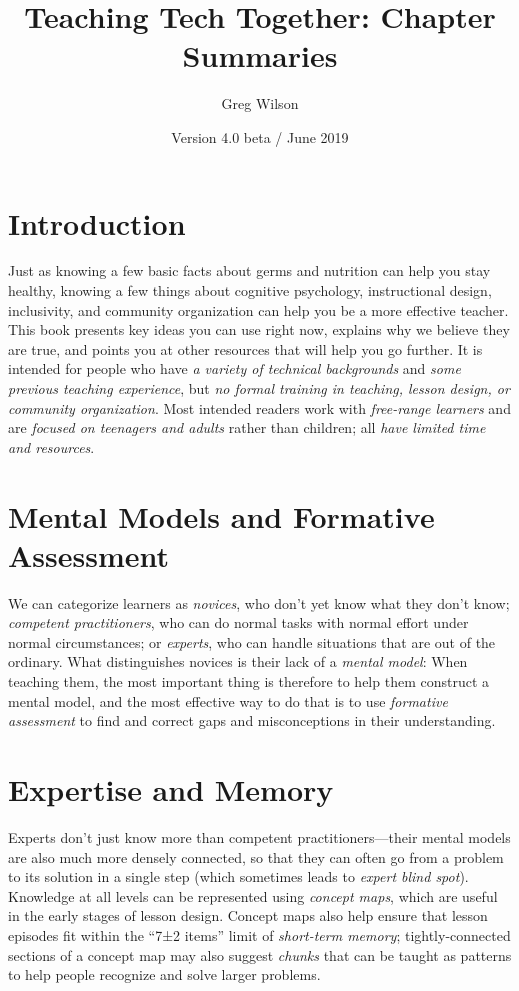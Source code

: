 \documentclass{article}
\begin{document}
\title{Teaching Tech Together: Chapter Summaries}
\author{Greg Wilson}
\date{Version 4.0 beta / June 2019}
\maketitle

\section{Introduction}

Just as knowing a few basic facts about germs and nutrition can help you stay healthy,
knowing a few things about cognitive psychology,
instructional design,
inclusivity,
and community organization
can help you be a more effective teacher.
This book presents key ideas you can use right now,
explains why we believe they are true,
and points you at other resources that will help you go further.
It is intended for people who have \emph{a variety of technical backgrounds}
and \emph{some previous teaching experience},
but \emph{no formal training in teaching, lesson design, or community organization}.
Most intended readers work with \emph{free-range learners}
and are \emph{focused on teenagers and adults}
rather than children;
all \emph{have limited time and resources}.

\section{Mental Models and Formative Assessment}

We can categorize learners as \emph{novices},
who don't yet know what they don't know;
\emph{competent practitioners},
who can do normal tasks with normal effort under normal circumstances;
or \emph{experts},
who can handle situations that are out of the ordinary.
What distinguishes novices is their lack of a \emph{mental model}:
When teaching them,
the most important thing is therefore to help them construct a mental model,
and the most effective way to do that is to use \emph{formative assessment}
to find and correct gaps and misconceptions in their understanding.

\section{Expertise and Memory}

Experts don't just know more than competent practitioners---their mental models
are also much more densely connected,
so that they can often go from a problem to its solution in a single step
(which sometimes leads to \emph{expert blind spot}).
Knowledge at all levels can be represented using \emph{concept maps},
which are useful in the early stages of lesson design.
Concept maps also help ensure that lesson episodes fit within
the ``7±2 items'' limit of \emph{short-term memory};
tightly-connected sections of a concept map may also suggest \emph{chunks}
that can be taught as patterns to help people recognize and solve larger problems.
\end{document}
